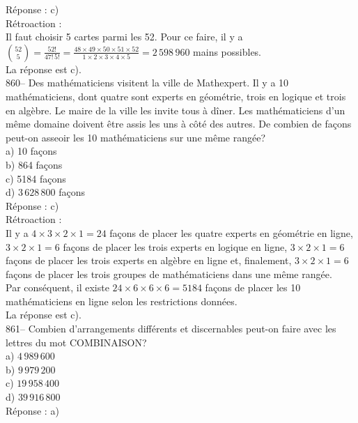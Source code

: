 ﻿\documentclass[letterpaper, 12pt]{article}
\begin{document}
R\'eponse : c)\\

R\'etroaction : \\
Il faut choisir 5 cartes parmi les 52.  Pour ce faire, il y a
$\binom{52}{5}=\frac{52!}{47!\,5!}=\frac{48\times49\times50\times51\times52}{1\times2\times3\times4\times5}=2\,598\,960$
mains possibles.\\
La r\'eponse est c).\\

860--  Des math\'ematiciens visitent la ville de Mathexpert.  Il y a 10
math\'ematiciens, dont quatre sont experts en g\'eom\'etrie, trois en
logique et trois en alg\`ebre.  Le maire de la ville les invite tous \`a
d\^iner.  Les math\'ematiciens d'un m\^eme domaine doivent \^etre assis les
uns \`a c\^ot\'e des autres.  De combien de fa\c cons peut-on asseoir les 10
math\'ematiciens sur une m\^eme rang\'ee?\\
a) 10  fa\c cons\\
b) 864  fa\c cons\\
c) 5184  fa\c cons\\
d) $3\,628\,800$  fa\c cons\\

R\'eponse : c)\\

R\'etroaction : \\
Il y a $4\times3\times2\times1=24$ fa\c cons de placer les quatre
experts en g\'eom\'etrie en ligne, $3\times2\times1=6$ fa\c cons de
placer les trois experts en logique en ligne, $3\times2\times1=6$
fa\c cons
de placer les trois experts en alg\`ebre en ligne et, finalement,
$3\times2\times1=6$ fa\c cons de placer les trois groupes de
math\'ematiciens dans une m\^eme rang\'ee.  \\
Par cons\'equent, il existe $24\times6\times6\times6=5184$ fa\c cons de
placer les 10 math\'ematiciens en ligne selon les restrictions donn\'ees.
\\
La r\'eponse est c).\\

861-- Combien d'arrangements diff\'erents et discernables peut-on faire avec
les lettres du mot \sloppy \mbox{COMBINAISON?}\\
a) $4\,989\,600$\\
b) $9\,979\,200$\\
c) $19\,958\,400$\\
d) $39\,916\,800$\\

R\'eponse : a)\\
\end{document}
